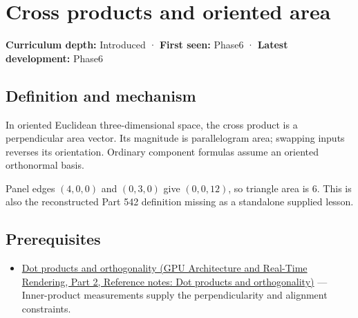 \hypertarget{appendix-2391db8052b1}{}\label{referencestart:appendix-2391db8052b1}
\section{Cross products and oriented area}\label{appendix-2391db8052b1-cross-products-and-oriented-area}

\hypertarget{appendix-2391db8052b1-cross-products-and-oriented-area}{}

\textbf{Curriculum depth:} Introduced · \textbf{First seen:} Phase6 · \textbf{Latest development:} Phase6

\begin{allmightroledefinition}

\subsection{Definition and mechanism}\label{appendix-2391db8052b1-definition-and-mechanism}

\hypertarget{appendix-2391db8052b1-definition-and-mechanism}{}

In oriented Euclidean three-dimensional space, the cross product is a perpendicular area vector. Its magnitude is parallelogram area; swapping inputs reverses its orientation. Ordinary component formulas assume an oriented orthonormal basis.

\end{allmightroledefinition}

Panel edges \((4,0,0)\) and \((0,3,0)\) give \((0,0,12)\), so triangle area is \(6\). This is also the reconstructed Part 542 definition missing as a standalone supplied lesson.

\subsection{Prerequisites}\label{appendix-2391db8052b1-prerequisites}

\hypertarget{appendix-2391db8052b1-prerequisites}{}

\begin{itemize}
\tightlist
\item
  \href{../06-GPU-Architecture-and-Real-Time-Rendering-P02/main.pdf\#nameddest=appendix-8bc4e8fc547c}{Dot products and orthogonality (GPU Architecture and Real-Time Rendering, Part 2, Reference notes: Dot products and orthogonality)} --- Inner-product measurements supply the perpendicularity and alignment constraints.
\end{itemize}

